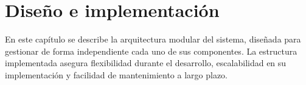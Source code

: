 \chapter{Diseño e implementación} %

\label{Chapter3} %
En este capítulo se describe la arquitectura modular del sistema, diseñada para gestionar de forma independiente cada uno de sus componentes. La estructura implementada asegura flexibilidad durante el desarrollo, escalabilidad en su implementación y facilidad de mantenimiento a largo plazo.


